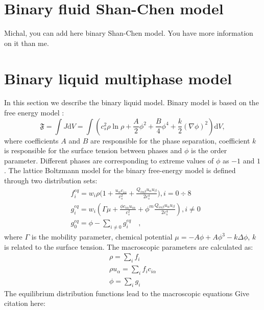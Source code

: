 \documentclass[mathpazo]{cicp}
\begin{document}
\appendix
\section{Binary fluid Shan-Chen model}
\label{sec:binary_shan_chen}
{\color{red} Michal, you can add here binary Shan-Chen model. You have more information on it than me.}
\section{Binary liquid multiphase model}
\label{sec:binary_free_energy}
In this section we describe the binary liquid model. Binary model is based on
the free energy model \cite{swift,landau}:
\begin{equation}
\mathfrak{F}=\int{J \mathrm{d}V}=\int{\left(c_s^2\rho\ln\rho+\frac{A}{2}\phi^2+\frac{B}{4}\phi^4 + \frac{k}{2}(\nabla \phi)^2 \right)\mathrm{d}V},
\end{equation}
where coefficients $A$ and $B$ are responsible for the phase separation,
coefficient $k$ is responsible for the surface tension between phases and
$\phi$ is the order parameter. Different phases are corresponding to
extreme values of $\phi$ as $-1$ and $1$.
The lattice Boltzmann model for the binary free-energy model is defined
through two distribution sets:
\begin{equation}
\begin{aligned}
&f_i^{eq}=w_i \rho \biggl(1+\frac{u_{\alpha}c_{i\alpha}}{c_s^2}+\frac{Q_{i\alpha\beta}u_{\alpha}u_{\beta}}{2 c_s^4}\biggr), i=0\div8\\
&g_i^{eq}=w_i(\Gamma \mu + \frac{\phi c_{i\alpha} u_{i\alpha}}{c_s^2}+\phi^m \frac{Q_{i\alpha\beta}u_{\alpha}u_{\beta}}{2 c_s^4}), i\neq0 \\
&g_0^{eq}=\phi-\sum_{i\neq0}{g_i^{eq}}\quad,
\end{aligned}
\end{equation}
where $\Gamma$ is the mobility parameter, chemical potential
$\mu=-A\phi+A\phi^3-k\Delta\phi$, $k$ is related to the surface
tension. The macroscopic parameters are calculated as:
\begin{equation}
\begin{aligned}
\rho=\sum_i{f_i}\\
\rho u_{\alpha}=\sum_i{f_i c_{i\alpha}}\\
\phi=\sum_i{g_i}
\end{aligned}
\end{equation}
The equilibrium distribution functions lead to the macroscopic equations
{\color{red} Give citation here}:
\end{document}
